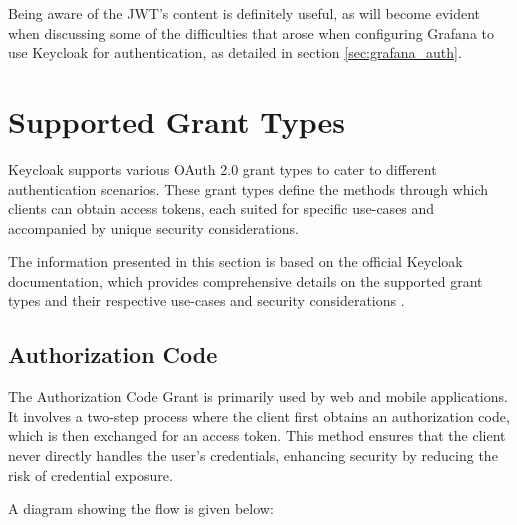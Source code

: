 Being aware of the JWT's content is definitely useful, as will become evident when discussing some of the difficulties that arose when configuring Grafana to use Keycloak for authentication, as detailed in section \ref{sec:grafana_auth}.

\section{Supported Grant Types}
Keycloak supports various OAuth 2.0 grant types to cater to different authentication scenarios. These grant types define the methods through which clients can obtain access tokens, each suited for specific use-cases and accompanied by unique security considerations.

The information presented in this section is based on the official Keycloak documentation, which provides comprehensive details on the supported grant types and their respective use-cases and security considerations \Parencite{keycloak2024}.

\subsection*{Authorization Code}\label{sec:auth_code}
The Authorization Code Grant is primarily used by web and mobile applications. It involves a two-step process where the client first obtains an authorization code, which is then exchanged for an access token. This method ensures that the client never directly handles the user's credentials, enhancing security by reducing the risk of credential exposure.

A diagram showing the flow is given below:

